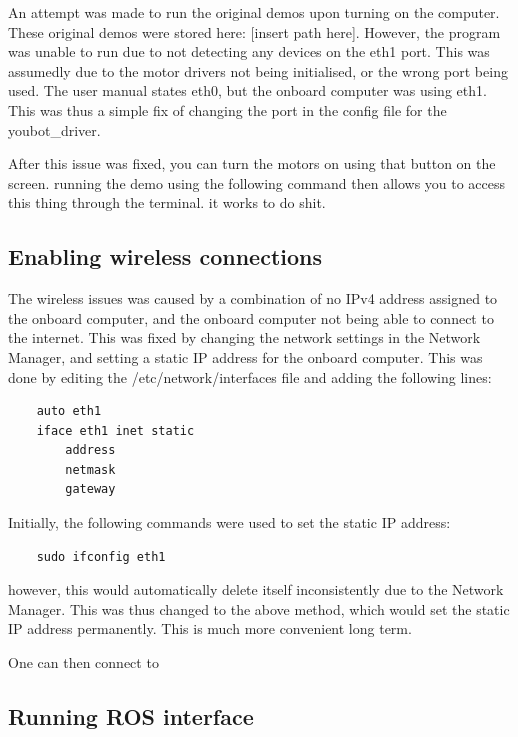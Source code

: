 \documentclass[a4paper, 12pt]{article}
\newif\ifshownotes
\newcommand{\notes}[1]{\ifshownotes\textcolor{blue}{#1}\fi}
\begin{document}
    An attempt was made to run the original demos upon turning on the computer. These original demos were stored here: [insert path here].
    However, the program was unable to run due to not detecting any devices on the eth1 port. This was assumedly due to the motor drivers not being initialised, or the wrong port being used. The user manual states eth0, but the onboard computer was using eth1. This was thus a simple fix of changing the port in the config file for the youbot\_driver. 

    
    After this issue was fixed, you can turn the motors on using that button on the screen. running the demo using the following command then allows you to access this thing through the terminal. it works to do shit.


    \subsection{Enabling wireless connections}

    The wireless issues was caused by a combination of no IPv4 address assigned to the onboard computer, and the onboard computer not being able to connect to the internet. This was fixed by changing the network settings in the Network Manager, and setting a static IP address for the onboard computer. This was done by editing the /etc/network/interfaces file and adding the following lines:

    \begin{verbatim}
    auto eth1
    iface eth1 inet static
        address
        netmask
        gateway
    \end{verbatim}

    Initially, the following commands were used to set the static IP address: 
    \begin{verbatim}
    sudo ifconfig eth1
    \end{verbatim}
    however, this would automatically delete itself inconsistently due to the Network Manager. This was thus changed to the above method, which would set the static IP address permanently. This is much more convenient long term. 

    One can then connect to 


    \pagebreak


    \subsection{Running ROS interface}

    \notes{
        so what packages were there?
    }
\end{document}
